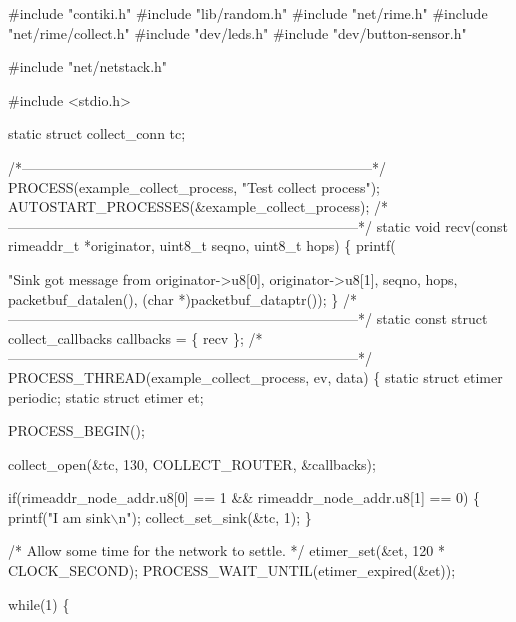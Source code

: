 \begin{DoxyCodeInclude}
\textcolor{preprocessor}{#include "contiki.h"}
\textcolor{preprocessor}{#include "lib/random.h"}
\textcolor{preprocessor}{#include "net/rime.h"}
\textcolor{preprocessor}{#include "net/rime/collect.h"}
\textcolor{preprocessor}{#include "dev/leds.h"}
\textcolor{preprocessor}{#include "dev/button-sensor.h"}

\textcolor{preprocessor}{#include "net/netstack.h"}

\textcolor{preprocessor}{#include <stdio.h>}

\textcolor{keyword}{static} \textcolor{keyword}{struct }collect\_conn tc;

\textcolor{comment}{/*---------------------------------------------------------------------------*/}
PROCESS(example\_collect\_process, \textcolor{stringliteral}{"Test collect process"});
AUTOSTART\_PROCESSES(&example\_collect\_process);
\textcolor{comment}{/*---------------------------------------------------------------------------*/}
\textcolor{keyword}{static} \textcolor{keywordtype}{void}
recv(\textcolor{keyword}{const} rimeaddr\_t *originator, uint8\_t seqno, uint8\_t hops)
\{
  printf(\textcolor{stringliteral}{"Sink got message from %
         originator->u8[0], originator->u8[1],
         seqno, hops,
         packetbuf\_datalen(),
         (\textcolor{keywordtype}{char} *)packetbuf\_dataptr());
\}
\textcolor{comment}{/*---------------------------------------------------------------------------*/}
\textcolor{keyword}{static} \textcolor{keyword}{const} \textcolor{keyword}{struct }collect\_callbacks callbacks = \{ recv \};
\textcolor{comment}{/*---------------------------------------------------------------------------*/}
PROCESS\_THREAD(example\_collect\_process, ev, data)
\{
  \textcolor{keyword}{static} \textcolor{keyword}{struct }etimer periodic;
  \textcolor{keyword}{static} \textcolor{keyword}{struct }etimer et;
  
  PROCESS\_BEGIN();

  collect\_open(&tc, 130, COLLECT\_ROUTER, &callbacks);

  \textcolor{keywordflow}{if}(rimeaddr\_node\_addr.u8[0] == 1 &&
     rimeaddr\_node\_addr.u8[1] == 0) \{
        printf(\textcolor{stringliteral}{"I am sink\(\backslash\)n"});
        collect\_set\_sink(&tc, 1);
  \}

  \textcolor{comment}{/* Allow some time for the network to settle. */}
  etimer\_set(&et, 120 * CLOCK\_SECOND);
  PROCESS\_WAIT\_UNTIL(etimer\_expired(&et));

  \textcolor{keywordflow}{while}(1) \{

}
\end{DoxyCodeInclude}
